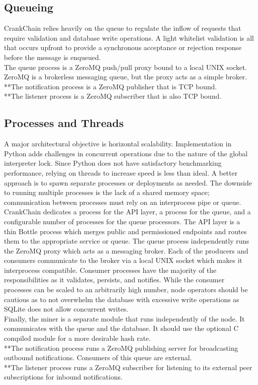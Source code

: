 \documentclass[10pt,twocolumn]{article}
\begin{document}
\subsection{Queueing}
CrankChain relies heavily on the queue to regulate the inflow of requests that require validation and database write operations.  A light whitelist validation is all that occurs upfront to provide a synchronous acceptance or rejection response before the message is enqueued.\\
The queue process is a ZeroMQ push/pull proxy bound to a local UNIX socket.  ZeroMQ is a brokerless messaging queue, but the proxy acts as a simple broker.\\
**The notification process is a ZeroMQ publisher that is TCP bound.\\
**The listener process is a ZeroMQ subscriber that is also TCP bound.
\subsection{Processes and Threads}
A major architectural objective is horizontal scalability.  Implementation in Python adds challenges in concurrent operations due to the nature of the global interpreter lock.  Since Python does not have satisfactory benchmarking performance, relying on threads to increase speed is less than ideal.  A better approach is to spawn separate processes or deployments as needed.  The downside to running multiple processes is the lack of a shared memory space; communication between processes must rely on an interprocess pipe or queue.  CrankChain dedicates a process for the API layer, a process for the queue, and a configurable number of processes for the queue processors.  The API layer is a thin Bottle process which merges public and permissioned endpoints and routes them to the appropriate service or queue.  The queue process independently runs the ZeroMQ proxy which acts as a messaging broker.  Each of the producers and consumers communicate to the broker via a local UNIX socket which makes it interprocess compatible.  Consumer processes have the majority of the responsibilities as it validates, persists, and notifies.  While the consumer processes can be scaled to an arbitrarily high number, node operators should be cautious as to not overwhelm the database with excessive write operations as SQLite does not allow concurrent writes.\\  
Finally, the miner is a separate module that runs independently of the node.  It communicates with the queue and the database.  It should use the optional C compiled module for a more desirable hash rate.\\
**The notification process runs a ZeroMQ publishing server for broadcasting outbound notifications.  Consumers of this queue are external.\\
**The listener process runs a ZeroMQ subscriber for listening to its external peer subscriptions for inbound notifications.
\end{document}
